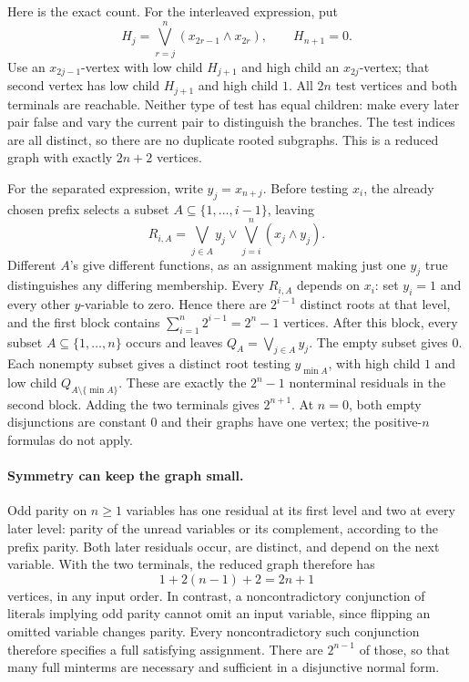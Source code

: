 Here is the exact count. For the interleaved expression, put
\[
 H_j=\bigvee_{r=j}^{n}(x_{2r-1}\land x_{2r}),\qquad H_{n+1}=0.
\]
Use an \(x_{2j-1}\)-vertex with low child \(H_{j+1}\) and high
child an \(x_{2j}\)-vertex; that second vertex has low child
\(H_{j+1}\) and high child \(1\). All \(2n\) test vertices and
both terminals are reachable. Neither type of test has equal
children: make every later pair false and vary the current
pair to distinguish the branches. The test indices are all
distinct, so there are no duplicate rooted subgraphs. This
is a reduced graph with exactly \(2n+2\) vertices.

For the separated expression, write \(y_j=x_{n+j}\).
Before testing \(x_i\), the already chosen prefix selects a subset
\(A\subseteq\{1,\ldots,i-1\}\), leaving
\[
 R_{i,A}=\bigvee_{j\in A}y_j
       \lor\bigvee_{j=i}^{n}(x_j\land y_j).
\]
Different \(A\)'s give different functions, as an assignment
making just one \(y_j\) true distinguishes any differing
membership. Every \(R_{i,A}\) depends on \(x_i\): set \(y_i=1\)
and every other \(y\)-variable to zero. Hence there are
\(2^{i-1}\) distinct roots at that level, and the first block
contains \(\sum_{i=1}^{n}2^{i-1}=2^n-1\) vertices.
After this block, every subset \(A\subseteq\{1,\ldots,n\}\)
occurs and leaves \(Q_A=\bigvee_{j\in A}y_j\).
The empty subset gives \(0\). Each nonempty subset gives a
distinct root testing \(y_{\min A}\), with high child \(1\)
and low child \(Q_{A\setminus\{\min A\}}\). These are exactly
the \(2^n-1\) nonterminal residuals in the second block.
Adding the two terminals gives \(2^{n+1}\).
At \(n=0\), both empty disjunctions are constant \(0\) and
their graphs have one vertex; the positive-\(n\) formulas
do not apply.

\paragraph{Symmetry can keep the graph small.}
Odd parity on \(n\geq1\) variables has one residual at its
first level and two at every later level: parity of the
unread variables or its complement, according to the
prefix parity. Both later residuals occur, are distinct,
and depend on the next variable. With the two terminals,
the reduced graph therefore has
\[
 1+2(n-1)+2=2n+1
\]
vertices, in any input order. In contrast, a noncontradictory
conjunction of literals
implying odd parity cannot omit an input variable, since
flipping an omitted variable changes parity. Every
noncontradictory such conjunction therefore specifies a
full satisfying assignment. There are \(2^{n-1}\) of those,
so that many full minterms are necessary and sufficient
in a disjunctive normal form.

